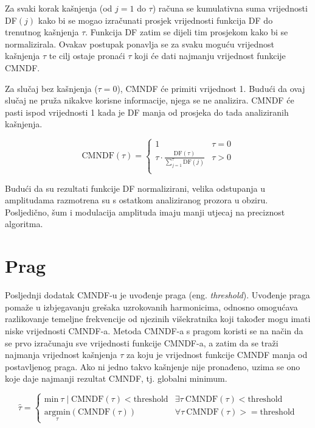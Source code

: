 \documentclass[times, utf8, diplomski, numeric]{fer}
\begin{document}
Za svaki korak kašnjenja (od $j = 1$ do $\tau$) računa se kumulativna suma vrijednosti DF$(j)$ kako bi se mogao izračunati prosjek vrijednosti funkcija DF do trenutnog kašnjenja $\tau$. Funkcija DF zatim se dijeli tim prosjekom kako bi se normalizirala. Ovakav postupak ponavlja se za svaku moguću vrijednost kašnjenja $\tau$ te cilj ostaje pronaći $\tau$ koji će dati najmanju vrijednost funkcije CMNDF.

Za slučaj bez kašnjenja ($\tau = 0$), CMNDF će primiti vrijednost 1. Budući da ovaj slučaj ne pruža nikakve korisne informacije, njega se ne analizira. CMNDF će pasti ispod vrijednosti 1 kada je DF manja od prosjeka do tada analiziranih kašnjenja.

\begin{equation}
	\mathrm{CMNDF}(\tau) =
	\begin{cases}
		1 & \tau = 0 \\
		\tau \cdot \frac{\mathrm{DF}(\tau)}{\sum_{j = 1}^{\tau}{\mathrm{DF}(j)}} & \tau > 0 \\
	\end{cases}
\end{equation}

Budući da su rezultati funkcije DF normalizirani, velika odstupanja u amplitudama razmotrena su s ostatkom analiziranog prozora u obziru. Posljedično, šum i modulacija amplituda imaju manji utjecaj na preciznost algoritma.


\section{Prag}
%
Posljednji dodatak CMNDF-u je uvođenje praga (eng. \textit{threshold}). Uvođenje praga pomaže u izbjegavanju grešaka uzrokovanih harmonicima, odnosno omogućava razlikovanje temeljne frekvencije od njezinih višekratnika koji također mogu imati niske vrijednosti CMNDF-a. Metoda CMNDF-a s pragom koristi se na način da se prvo izračunaju sve vrijednosti funkcije CMNDF-a, a zatim da se traži najmanja vrijednost kašnjenja $\tau$ za koju je vrijednost funkcije CMNDF manja od postavljenog praga. Ako ni jedno takvo kašnjenje nije pronađeno, uzima se ono koje daje najmanji rezultat CMNDF, tj. globalni minimum.

\begin{equation}
	\hat{\tau} =
	\begin{cases}
		\mathrm{min} \ \tau \mid \mathrm{CMNDF}(\tau) < \mathrm{threshold} & \exists \tau \ \mathrm{CMNDF}(\tau) < \mathrm{threshold} \\
		\underset{\tau}{\mathrm{argmin}} (\mathrm{CMNDF}(\tau)) & \forall \tau \ \mathrm{CMNDF}(\tau) >= \mathrm{threshold}
	\end{cases}
\end{equation}
 
\end{document}
